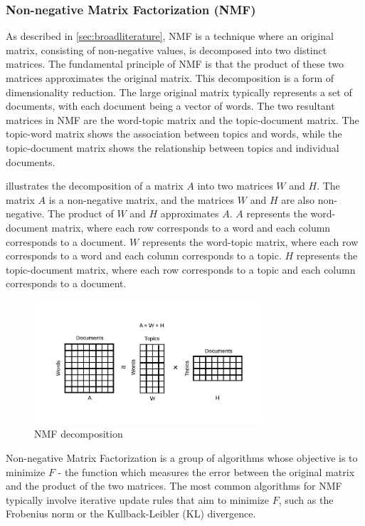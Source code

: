 \documentclass{article}
\begin{document}
\subsubsection{Non-negative Matrix Factorization (NMF)}
As described in \cref{sec:broadliterature}, NMF \cite{shahnaz_document_2006, kasiviswanathan_emerging_2011, yan_learning_2013} is a technique where an original matrix, consisting of non-negative values, is decomposed into two distinct matrices. The fundamental principle of NMF is that the product of these two matrices approximates the original matrix. This decomposition is a form of dimensionality reduction. The large original matrix typically represents a set of documents, with each document being a vector of words. The two resultant matrices in NMF are the word-topic matrix and the topic-document matrix. The topic-word matrix shows the association between topics and words, while the topic-document matrix shows the relationship between topics and individual documents.

 illustrates the decomposition of a matrix \(A\) into two matrices \(W\) and \(H\). The matrix \(A\) is a non-negative matrix, and the matrices \(W\) and \(H\) are also non-negative. The product of \(W\) and \(H\) approximates \(A\). \(A\) represents the word-document matrix, where each row corresponds to a word and each column corresponds to a document. \(W\) represents the word-topic matrix, where each row corresponds to a word and each column corresponds to a topic. \(H\) represents the topic-document matrix, where each row corresponds to a topic and each column corresponds to a document.

\begin{figure}[h] %
    \centering
    \includegraphics[width=0.75\textwidth]{images/nmf.pdf}
    \caption{NMF decomposition}
    \label{fig:nmf}
\end{figure}

Non-negative Matrix Factorization is a group of algorithms whose objective is to minimize $F$ - the function which measures the error between the original matrix and the product of the two matrices. The most common algorithms for NMF typically involve iterative update rules that aim to minimize $F$, such as the Frobenius norm or the Kullback-Leibler (KL) divergence.
\end{document}
